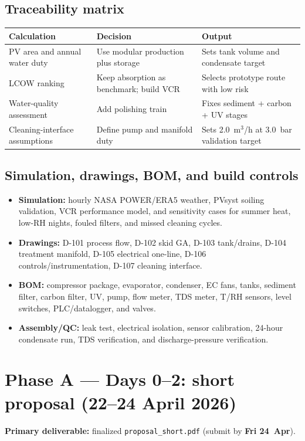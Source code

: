 \documentclass[11pt,a4paper]{article}
\begin{document}
\subsection{Traceability matrix}
\begin{table}[h]
\centering
\small
\begin{tabular}{@{}p{4.1cm}p{4.0cm}p{6.5cm}@{}}
\toprule
\textbf{Calculation} & \textbf{Decision} & \textbf{Output} \\
\midrule
PV area and annual water duty & Use modular production plus storage & Sets tank volume and condensate target \\
LCOW ranking & Keep absorption as benchmark; build VCR & Selects prototype route with low risk \\
Water-quality assessment & Add polishing train & Fixes sediment + carbon + UV stages \\
Cleaning-interface assumptions & Define pump and manifold duty & Sets 2.0~m$^3$/h at 3.0~bar validation target \\
\bottomrule
\end{tabular}
\end{table}

\subsection{Simulation, drawings, BOM, and build controls}
\begin{itemize}[leftmargin=*]
  \item \textbf{Simulation:} hourly NASA POWER/ERA5 weather, PVsyst soiling validation, VCR performance model, and sensitivity cases for summer heat, low-RH nights, fouled filters, and missed cleaning cycles.
  \item \textbf{Drawings:} D-101 process flow, D-102 skid GA, D-103 tank/drains, D-104 treatment manifold, D-105 electrical one-line, D-106 controls/instrumentation, D-107 cleaning interface.
  \item \textbf{BOM:} compressor package, evaporator, condenser, EC fans, tanks, sediment filter, carbon filter, UV, pump, flow meter, TDS meter, T/RH sensors, level switches, PLC/datalogger, and valves.
  \item \textbf{Assembly/QC:} leak test, electrical isolation, sensor calibration, 24-hour condensate run, TDS verification, and discharge-pressure verification.
\end{itemize}

\section{Phase A --- Days 0--2: short proposal (22--24 April 2026)}
\textbf{Primary deliverable:} finalized \texttt{proposal\_short.pdf} (submit by \textbf{Fri 24~Apr}).
\end{document}

